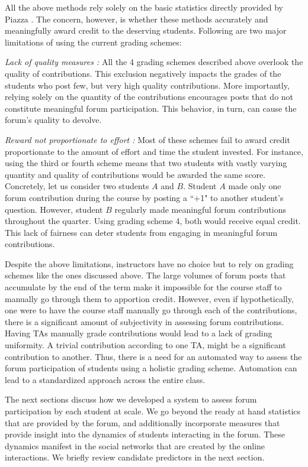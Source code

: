 All the above methods rely solely on the basic statistics directly
provided by Piazza \cite{Piazza}. The concern, however, is whether these methods
accurately and meaningfully award credit to the deserving
students. Following are two major limitations of using the current
grading schemes: \squishlist
\item \emph{Lack of quality measures :} All the 4 grading schemes described above
  overlook the quality of contributions. This exclusion negatively
  impacts the grades of the students who post few, but very high quality
  contributions. More importantly, relying
  solely on the quantity of the contributions encourages posts that 
  do not constitute meaningful forum participation. This behavior, in turn, can cause the forum's
  quality to devolve.
\item \emph{Reward not proportionate to effort :} Most of these
  schemes fail to award credit proportionate to the amount of effort
  and time the student invested. For instance, using the third or
  fourth scheme means that two students with vastly varying quantity
  and quality of contributions would be awarded the same score.
  Concretely, let us consider two students $A$ and $B$. Student $A$
  made only one forum contribution during the course by posting a ``+1"
  to another student's question. However, student $B$ regularly made
  meaningful forum contributions throughout the quarter. Using grading
  scheme 4, both would receive equal credit. This lack of fairness can deter students from engaging in meaningful forum contributions.
  \squishend

Despite the above limitations, instructors have no choice but to
rely on grading schemes like the ones discussed above. The large
volumes of forum posts that accumulate by the end of the term make it
impossible for the course staff to manually go through them to
apportion credit. However, even if hypothetically, one were to have
the course staff manually go through each of the contributions, there
is a significant amount of subjectivity in assessing forum
contributions. Having TAs manually grade contributions would lead to a
lack of grading uniformity. A trivial contribution according to one
TA, might be a significant contribution to another. Thus, there is a
need for an automated way to assess the forum participation of
students using a holistic grading scheme. Automation can lead to a
standardized approach across the entire class.

The next sections discuss how we developed a system to assess forum
participation by each student at scale. We go beyond the ready at hand
statistics that are provided by the forum, and additionally
incorporate measures that provide insight into the dynamics of
students interacting in the forum. These dynamics manifest in the
social networks that are created by the online interactions. We
briefly review candidate predictors in the next section.


